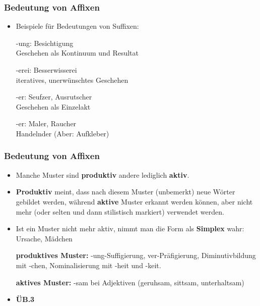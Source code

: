 \begin{frame}
\frametitle{Bedeutung von Affixen}

\begin{itemize}
	\item Beispiele für Bedeutungen von Suffixen:

\vspace{1em}

	\ea -ung: Besichtigung\\
	\ras Geschehen als Kontinuum und Resultat
	\z
	
	\ea -erei: Besserwisserei\\
\ras iteratives, unerwünschtes Geschehen
	\z

	\ea -er: Seufzer, Ausrutscher\\
\ras Geschehen als Einzelakt
	\z

	\ea -er: Maler, Raucher\\ 
	\ras Handelnder (Aber: Aufkleber)
	\z

\end{itemize}

\end{frame}





\begin{frame}
\frametitle{Bedeutung von Affixen}

\begin{itemize}
	\item Manche Muster sind \textbf{produktiv} andere lediglich \textbf{aktiv}.
	\item \textbf{Produktiv} meint, dass nach diesem Muster (unbemerkt) neue Wörter gebildet werden, während \textbf{aktive} Muster erkannt werden können, aber nicht mehr (oder selten und dann stilistisch markiert) verwendet werden.
	\item Ist ein Muster nicht mehr aktiv, nimmt man die Form als \textbf{Simplex} wahr: Ursache, Mädchen
	
	\ea \textbf{produktives Muster:} -ung-Suffigierung, ver-Präfigierung, Diminutivbildung mit -chen, Nominalisierung mit -heit und -keit.
	\z
	
	\ea  \textbf{aktives Muster:} -sam bei Adjektiven (geruhsam, sittsam,
unterhaltsam)
	\z

	\item \textbf{ÜB.3}
	
\end{itemize}

\end{frame}


